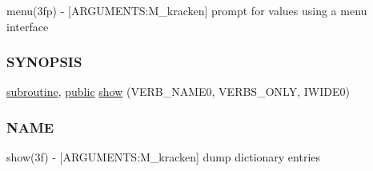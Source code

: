 \begin{DoxyCompactItemize}
\begin{DoxyCompactList}
menu(3fp) -\/ \mbox{[}A\+R\+G\+U\+M\+E\+N\+TS\+:M\+\_\+kracken\mbox{]} prompt for values using a menu interface \subsubsection*{S\+Y\+N\+O\+P\+S\+IS}\end{DoxyCompactList}\item 
\hyperlink{M__stopwatch_83_8txt_acfbcff50169d691ff02d4a123ed70482}{subroutine}, \hyperlink{M__stopwatch_83_8txt_a2f74811300c361e53b430611a7d1769f}{public} \hyperlink{namespacem__kracken_ae1bb0ffb2cd28ae8cc8fade9f1988c3c}{show} (V\+E\+R\+B\+\_\+\+N\+A\+M\+E0, V\+E\+R\+B\+S\+\_\+\+O\+N\+LY, I\+W\+I\+D\+E0)
\begin{DoxyCompactList}\small\item\em \subsubsection*{N\+A\+ME}

show(3f) -\/ \mbox{[}A\+R\+G\+U\+M\+E\+N\+TS\+:M\+\_\+kracken\mbox{]} dump dictionary entries \end{DoxyCompactList}\end{DoxyCompactItemize}
